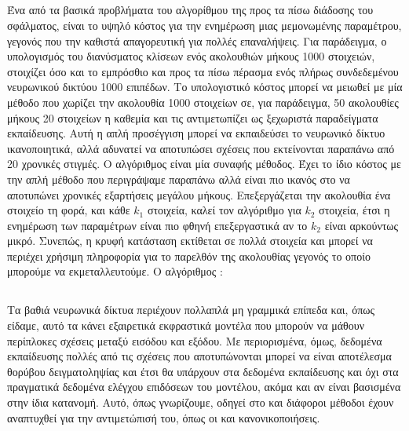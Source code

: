 \subsection{}
Ένα από τα βασικά προβλήματα του αλγορίθμου της προς τα πίσω διάδοσης του σφάλματος, είναι το υψηλό κόστος για την ενημέρωση μιας μεμονωμένης παραμέτρου, γεγονός που την καθιστά απαγορευτική για πολλές επαναλήψεις.
Για παράδειγμα, ο υπολογισμός του διανύσματος κλίσεων ενός  ακολουθιών μήκους 1000 στοιχειών, στοιχίζει όσο και το εμπρόσθιο και προς τα πίσω πέρασμα ενός πλήρως συνδεδεμένου νευρωνικού δικτύου 1000 επιπέδων.
Το υπολογιστικό κόστος μπορεί να μειωθεί με μία μέθοδο που χωρίζει την ακολουθία 1000 στοιχείων σε, για παράδειγμα, 50 ακολουθίες μήκους 20 στοιχείων η καθεμία και τις αντιμετωπίζει ως ξεχωριστά παραδείγματα εκπαίδευσης.
Αυτή η απλή προσέγγιση μπορεί να εκπαιδεύσει το νευρωνικό δίκτυο ικανοποιητικά, αλλά αδυνατεί να αποτυπώσει σχέσεις που εκτείνονται παραπάνω από 20 χρονικές στιγμές.
Ο αλγόριθμος  είναι μία συναφής μέθοδος.
Έχει το ίδιο κόστος με την απλή μέθοδο που περιγράψαμε παραπάνω αλλά είναι πιο ικανός στο να αποτυπώνει χρονικές εξαρτήσεις μεγάλου μήκους.
Επεξεργάζεται την ακολουθία ένα στοιχείο τη φορά, και κάθε $k_1$ στοιχεία, καλεί τον αλγόριθμο  για $k_2$ στοιχεία, έτσι η ενημέρωση των παραμέτρων είναι πιο φθηνή επεξεργαστικά αν το $k_2$ είναι αρκούντως μικρό.
Συνεπώς, η κρυφή κατάσταση εκτίθεται σε πολλά στοιχεία και μπορεί να περιέχει χρήσιμη πληροφορία για το παρελθόν της ακολουθίας γεγονός το οποίο μπορούμε να εκμεταλλευτούμε.
Ο αλγόριθμος :

\begin{algorithm}
\caption{}
\begin{algorithmic}
\ENDIF
\ENDFOR
\end{algorithmic}
\end{algorithm}

\subsection{\cite{Srivastava2014}}

Τα βαθιά νευρωνικά δίκτυα περιέχουν πολλαπλά μη γραμμικά επίπεδα και, όπως είδαμε, αυτό τα κάνει εξαιρετικά εκφραστικά μοντέλα που μπορούν να μάθουν περίπλοκες σχέσεις μεταξύ εισόδου και εξόδου.
Με περιορισμένα, όμως, δεδομένα εκπαίδευσης πολλές από τις σχέσεις που αποτυπώνονται μπορεί να είναι αποτέλεσμα θορύβου δειγματοληψίας και έτσι θα υπάρχουν στα δεδομένα εκπαίδευσης και όχι στα πραγματικά δεδομένα ελέγχου επιδόσεων του μοντέλου, ακόμα και αν είναι βασισμένα στην ίδια κατανομή.
Αυτό, όπως γνωρίζουμε, οδηγεί στο  και διάφοροι μέθοδοι έχουν αναπτυχθεί για την αντιμετώπισή του, όπως οι  και  κανονικοποιήσεις.

